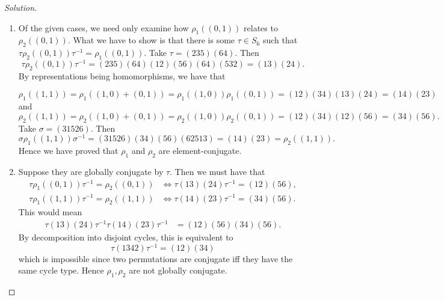 \begin{proof}[Solution]
\hfill
\begin{enumerate}[font=\normalfont,label=\textbf{(\alph*)}, wide]
\item Of the given cases, we need only examine how $\rho_1 ((0, 1))$ relates to $\rho_2((0, 1))$. What we have to show is that there is some $\tau \in S_6$ such that $\tau \rho_2((0, 1)) \tau^{-1} = \rho_1((0, 1))$. Take $\tau = (235)(64)$. Then
\[
\tau \rho_2((0, 1)) \tau^{-1} = (235)(64)(12)(56)(64)(532) = (13)(24).
\]
By representations being homomorphisms, we have that

\[
\rho_1((1, 1)) = \rho_1((1, 0) + (0,1)) =  \rho_1((1, 0)) \rho_1((0, 1)) = (12)(34)(13)(24) = (14)(23)
\]
and
\[
\rho_2((1, 1)) = \rho_2((1, 0) + (0,1)) =  \rho_2((1, 0)) \rho_2((0, 1)) = (12)(34)(12)(56) = (34)(56).
\]
Take $\sigma = (31526)$. Then
\[
\sigma\rho_1((1, 1))\sigma^{-1} = (31526)(34)(56)(62513) = (14)(23) = \rho_2((1,1)).
\]
Hence we have proved that $\rho_1$ and $\rho_2$ are element-conjugate.

\item Suppose they are globally conjugate by $\tau$. Then we must have that
\[
\begin{aligned}
\tau \rho_1((0, 1))\tau^{-1} = \rho_2((0, 1)) &\iff \tau (13)(24)\tau^{-1} = (12)(56), \\
\tau \rho_1((1, 1))\tau^{-1} = \rho_2((1, 1)) &\iff \tau (14)(23)\tau^{-1} = (34)(56).
\end{aligned}
\]
This would mean
\[
\begin{aligned}
\tau (13)(24)\tau^{-1}\tau (14)(23)\tau^{-1} &= (12)(56)(34)(56).
\end{aligned}
\]
By decomposition into disjoint cycles, this is equivalent to
\[
\tau (1342)\tau^{-1} = (12)(34)
\]
which is impossible since two permutations are conjugate iff they have the same cycle type. Hence $\rho_1, \rho_2$ are not globally conjugate.
\end{enumerate}
\end{proof}

